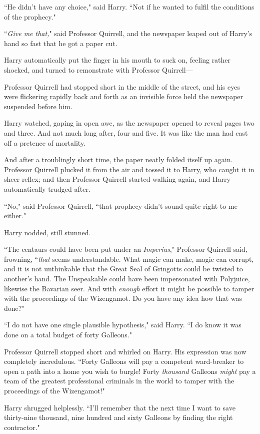 ``He didn't have any choice," said Harry. ``Not if he wanted to fulfil the conditions of the prophecy."

``\emph{Give me that,}" said Professor Quirrell, and the newspaper leaped out of Harry's hand so fast that he got a paper cut.

Harry automatically put the finger in his mouth to suck on, feeling rather shocked, and turned to remonstrate with Professor Quirrell—

Professor Quirrell had stopped short in the middle of the street, and his eyes were flickering rapidly back and forth as an invisible force held the newspaper suspended before him.

Harry watched, gaping in open awe, as the newspaper opened to reveal pages two and three. And not much long after, four and five. It was like the man had cast off a pretence of mortality.

And after a troublingly short time, the paper neatly folded itself up again. Professor Quirrell plucked it from the air and tossed it to Harry, who caught it in sheer reflex; and then Professor Quirrell started walking again, and Harry automatically trudged after.

``No," said Professor Quirrell, ``that prophecy didn't sound quite right to me either."

Harry nodded, still stunned.

``The centaurs could have been put under an \emph{Imperius}," Professor Quirrell said, frowning, ``\emph{that} seems understandable. What magic can make, magic can corrupt, and it is not unthinkable that the Great Seal of Gringotts could be twisted to another's hand. The Unspeakable could have been impersonated with Polyjuice, likewise the Bavarian seer. And with \emph{enough} effort it might be possible to tamper with the proceedings of the Wizengamot. Do you have any idea how that was done?"

``I do not have one single plausible hypothesis," said Harry. ``I do know it was done on a total budget of forty Galleons."

Professor Quirrell stopped short and whirled on Harry. His expression was now completely incredulous. ``Forty Galleons will pay a competent ward-breaker to open a path into a home you wish to burgle! Forty \emph{thousand} Galleons \emph{might} pay a team of the greatest professional criminals in the world to tamper with the proceedings of the Wizengamot!"

Harry shrugged helplessly. ``I'll remember that the next time I want to save thirty-nine thousand, nine hundred and sixty Galleons by finding the right contractor."


